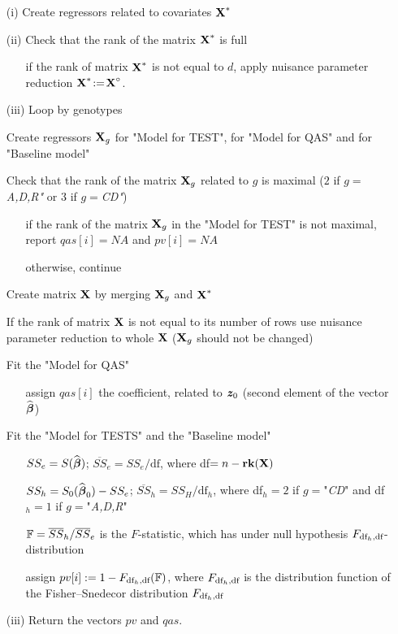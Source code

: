 \documentclass[11pt]{article}
\begin{document}
\begin{itemize}
\setlength\itemsep{-0.3em}
\item[(i)]
Create regressors related to covariates $\mbox{\bf X}^*$
\item[(ii)]
Check that the rank of the matrix $\mbox{\bf X}^*$ is full\vspace{-2mm}
\begin{itemize}
\setlength\itemsep{-0.3em}
\item[]
if the rank of matrix $\mbox{\bf X}^*$ is not equal to $d$,  apply nuisance parameter reduction $\mbox{\bf X}^*\!:=\!\mbox{\bf X}^{\circ}$. 
\end{itemize}
\item[(iii)]
Loop by genotypes
\item[]
Create regressors $\mbox{\bf X}_g$ for "Model for TEST", for "Model for QAS" and for "Baseline model"
\item[]
Check that the rank of the matrix $\mbox{\bf X}_g$ related to $g$ is maximal ($2$ if $g=${\it A,D,R"} or 3 if $g=${\it CD"})
\vspace{-2mm}
\begin{itemize}
\setlength\itemsep{-0.3em}
\item[]
if the rank of the matrix $\mbox{\bf X}_g$ in the "Model for TEST" is not maximal, report $qas[i]=NA$ and $pv[i]=NA$ 
\item[]
otherwise, continue
\end{itemize}
\item[]
Create matrix $\mbox{\bf X}$ by merging $\mbox{\bf X}_g$ and $\mbox{\bf X}^*$
\item[]
If the rank of matrix $\mbox{\bf X}$ is not equal to its number of rows use nuisance parameter reduction to whole $\mbox{\bf X}$ ($\mbox{\bf X}_g$ should not be changed) 
\item[]
Fit the "Model for QAS"
\vspace{-2mm}
\begin{itemize}
\setlength\itemsep{-0.1em}
\item[]
assign $qas[i]$ the coefficient, related to $\mbox{\textbf{\textit z}}_0$ (second element of the vector $\widehat{{\boldsymbol \beta}}$)
\end{itemize}
\item[]
Fit the "Model for TESTS" and the "Baseline model" 
\vspace{-2mm}
\begin{itemize}
\setlength\itemsep{-0.1em}
\item[]
$SS_e=S(\widehat{{\boldsymbol \beta}})$; $\overline{SS}_e=SS_e/\mbox{df}$, where df$=n-\mbox{\bf rk}(\mbox{\bf X})$
\item[]
$SS_h=S_0(\widehat{{\boldsymbol \beta}}_0)-SS_e$; $\overline{SS}_h=SS_H/\mbox{df}_h$, where df$_h=2$ if $g=$"{\it CD}" and df$_h=1$ if $g=$"{\it A,D,R}"
\item[]
${\mathbb F}=\overline{SS}_h/\overline{SS}_e$ is the $F$-statistic, which has under null hypothesis $F_{\mbox{\scriptsize df}_h,\mbox{\scriptsize df}}$-distribution
\item[]
assign $pv[i]:=1-F_{\mbox{\scriptsize df}_h,\mbox{\scriptsize df}}({\mathbb F})$, where $F_{\mbox{\scriptsize df}_h,\mbox{\scriptsize df}}$ is the distribution function of the Fisher--Snedecor distribution $F_{\mbox{\scriptsize df}_h,\mbox{\scriptsize df}}$
\end{itemize}
\item[(iii)]
Return the vectors $pv$ and $qas$. 
\end{itemize}
\end{document}
